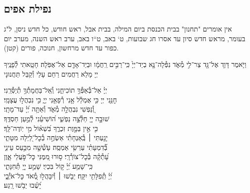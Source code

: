 \documentclass[twoside, openany, parskip=half, 11pt]{book}
\begin{document}
\subsection*{ נפילת אפים }

\newcommand{\nefilasapayim}{

וַיֹּ֧אמֶר דָּוִ֛ד אֶל־גָּ֖ד\source{שמואל ב כד} צַר־לִ֣י מְ֯אֹ֑ד נִפְּ֯לָה־נָּ֤א בְיַד־יְיָ֙ כִּֽי־רַבִּ֣ים רַֽחֲמָ֔ו וּבְיַד־אָדָ֖ם אַל־אֶפֹּֽלָה׃
\firstword{רַחוּם וְ֯חַנּוּן,}
חָטָֽאתִי לְ֯פָנֶֽיךָ יְיָ מָלֵא רַחֲמִים רַחֵם עָלַי וְ֯קַבֵּל תַּחֲנוּנָי
\begin{narrow}
יְיָ֗ אַל־בְּ֯אַפְּ֯ךָ֥ תוֹכִיחֵ֑נִי \hfill וְֽ֯אַל־בַּחֲמָתְ֯ךָ֥ תְ֯יַסְּ֯רֵֽנִי׃ \\
חׇנֵּ֥נִי יְיָ כִּ֤י אֻמְלַ֫ל אָ֥נִי \hfill רְ֯פָאֵ֥נִי יְיָ֑ כִּ֖י נִבְהֲל֣וּ עֲצָמָֽי׃ \\
וְ֭֯נַפְשִׁי נִבְהֲלָ֣ה מְ֯אֹ֑ד \hfill וְ֯אַתָּ֥ה יְ֝יָ֗ עַד־מָתָֽי׃ \\
שׁוּבָ֣ה יְיָ֭ חַלְּ֯צָ֣ה נַפְשִׁ֑י \hfill ה֝וֹשִׁיעֵ֗נִי לְ֯מַ֣עַן חַסְדֶּֽךָ׃ \\
כִּ֤י אֵ֣ין בַּמָּ֣וֶת זִכְרֶ֑ךָ \hfill בִּ֝שְׁא֗וֹל מִ֣י יֽוֹדֶה־לָּֽךְ׃ \\
יָגַ֤עְתִּי ׀ בְּֽ֯אַנְחָתִ֗י \hfill אַשְׂחֶ֣ה בְ֯כׇל־לַ֭יְלָה מִטָּתִ֑י\\ בְּ֯֝דִמְעָתִ֗י עַרְשִׂ֥י אַמְסֶֽה׃ \hfill
עָשְׁ֯שָׁ֣ה מִכַּ֣עַס עֵינִ֑י \\ עָ֝תְ֯קָ֗ה בְּ֯כׇל־צוֹרְ֯רָֽי׃ \hfill
ס֣וּרוּ מִ֭מֶּנִּי כׇּל־פֹּ֣עֲלֵי אָ֑וֶן \\ כִּֽי־שָׁמַ֥ע יְ֝יָ֗ ק֣וֹל בִּכְיִֽי׃ \hfill
שָׁמַ֣ע יְיָ֭ תְּ֯חִנָּתִ֑י \\ יְ֝יָ֗ תְּֽ֯פִלָּתִ֥י יִקָּֽח׃ \hfill
יֵבֹ֤שׁוּ ׀ וְ֯יִבָּהֲל֣וּ מְ֭֯אֹד כׇּל־אֹיְ֯בָ֑י \\ יָ֝שֻׁ֗בוּ יֵבֹ֥שׁוּ רָֽגַע׃ \hfill \break
\end{narrow}\negline
}



\begin{scriptsize}

\textsf{
אין אומרים "תחנון" בבית הכנסת ביום המילה, בבית אבל, ראש חודש, כל חדש ניסן, ל"ג בעומר, מראש חדש סיון עד אסרו חג שבועות, ט` באב, ט``ו באב, ערב ראש השנה, מערב יום כפור עד חדש מרחשון, חנוכה, פורים (קטן).
}

\end{scriptsize}
\nefilasapayim \label{nefilas_apayim}

\negline
\end{document}
